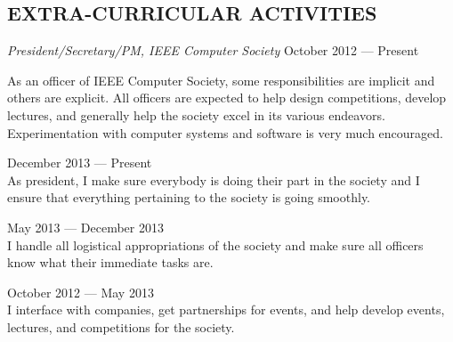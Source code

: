 \documentclass[margin]{res}
\begin{document}
\begin{resume}
  \section{EXTRA-CURRICULAR ACTIVITIES}
  {\sl President/Secretary/PM, IEEE Computer Society}
  \hfill October 2012 --- Present \\
  \vspace{-1.0em}
  \begin{adjustwidth}{1.5em}{0pt}
    As an officer of IEEE Computer Society, some responsibilities are
    implicit and others are explicit. All officers are expected to
    help design competitions, develop lectures, and generally help the
    society excel in its various endeavors. Experimentation with
    computer systems and software is very much encouraged.
    \begin{description}[leftmargin=1.5em]
    \item [President] \hfill December 2013 --- Present \\
      As president, I make sure everybody is doing their part in the
      society and I ensure that everything pertaining to the society is
      going smoothly.
    \item [Secretary] \hfill May 2013 --- December 2013 \\
      I handle all logistical appropriations of the society and make
      sure all officers know what their immediate tasks are.
    \item [Project Manager] \hfill October 2012 --- May 2013 \\
      I interface with companies, get partnerships for events, and
      help develop events, lectures, and competitions for the
      society.
    \end{description}
  \end{adjustwidth}

\end{resume}
\end{document}
